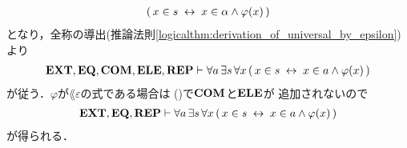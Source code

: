\begin{sketch}
\begin{description}
\begin{align}
					(\, x \in s \hspace{0.25em}\leftrightarrow\hspace{0.25em} x \in \alpha \wedge \varphi(x)\, )
				\end{align}
				となり，全称の導出(推論法則\ref{logicalthm:derivation_of_universal_by_epsilon})より
				\begin{align}
					\mbox{{\bf EXT}},\mbox{{\bf EQ}},\mbox{\bf COM},\mbox{{\bf ELE}},\mbox{{\bf REP}} \vdash 
					\forall a\, \exists s\, \forall x\,
					(\, x \in s \hspace{0.25em}\leftrightarrow\hspace{0.25em} x \in a \wedge \varphi(x)\, )
				\end{align}
				が従う．$\varphi$が$\lang{\varepsilon}$の式である場合は
				()で$\mbox{\bf COM}$と$\mbox{{\bf ELE}}$が
				追加されないので
				\begin{align}
					\mbox{{\bf EXT}},\mbox{{\bf EQ}},\mbox{{\bf REP}} \vdash 
					\forall a\, \exists s\, \forall x\,
					(\, x \in s \hspace{0.25em}\leftrightarrow\hspace{0.25em} x \in a \wedge \varphi(x)\, )
				\end{align}
				が得られる．
				\QED
		\end{description}
	\end{sketch}
	
	
